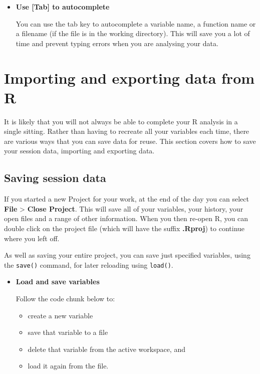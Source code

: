 \documentclass[a4paper]{book}
\providecommand{\tightlist}{%
  \setlength{\itemsep}{0pt}\setlength{\parskip}{0pt}}
\newenvironment{rmdblock}[1]
  {\vspace{1.5em}\begin{shaded*}
  \begin{itemize}
  \renewcommand{\labelitemi}{
    \raisebox{-.7\height}[0pt][0pt]{
      {\setkeys{Gin}{width=3em,keepaspectratio}\texttt{[image: images/\#1]}}
    }
  }
  \item
  }
  {
  \end{itemize}
  \end{shaded*}
  }
\newenvironment{rmdtip}
  {\begin{rmdblock}{tip}}
  {\end{rmdblock}}
\newenvironment{rmdexercise}
  {\begin{rmdblock}{exercise}}
  {\end{rmdblock}}
\begin{document}
\begin{rmdtip}
\textbf{Use {[}Tab{]} to autocomplete}

You can use the tab key to autocomplete a variable name, a function name
or a filename (if the file is in the working directory). This will save
you a lot of time and prevent typing errors when you are analysing your
data.
\end{rmdtip}

\chapter{Importing and exporting data from
R}\label{importing-and-exporting-data-from-r}

It is likely that you will not always be able to complete your R
analysis in a single sitting. Rather than having to recreate all your
variables each time, there are various ways that you can save data for
reuse. This section covers how to save your session data, importing and
exporting data.

\section{Saving session data}\label{saving-session-data}

If you started a new Project for your work, at the end of the day you
can select \textbf{File} \textgreater{} \textbf{Close Project}. This
will save all of your variables, your history, your open files and a
range of other information. When you then re-open R, you can double
click on the project file (which will have the suffix \textbf{.Rproj})
to continue where you left off.

As well as saving your entire project, you can save just specified
variables, using the \texttt{save()} command, for later reloading using
\texttt{load()}.

\begin{rmdexercise}
\textbf{Load and save variables}

Follow the code chunk below to:

\begin{itemize}
\tightlist
\item
  create a new variable
\item
  save that variable to a file
\item
  delete that variable from the active workspace, and
\item
  load it again from the file.
\end{itemize}
\end{rmdexercise}
\end{document}
